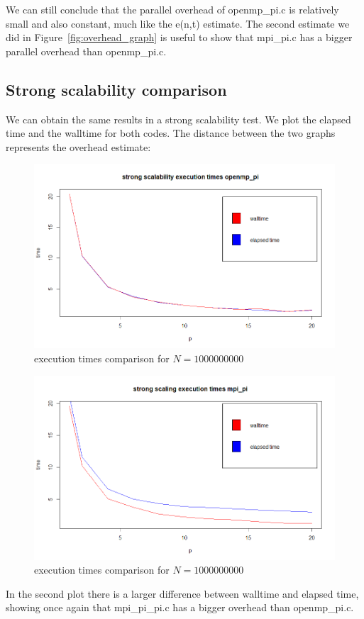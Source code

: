 \documentclass{article}
\begin{document}
We can still conclude that the parallel overhead of openmp\_pi.c is relatively small and also constant, much like the e(n,t) estimate. The second estimate we did in Figure~\ref{fig:overhead_graph} is useful to show that mpi\_pi.c has a bigger parallel overhead than openmp\_pi.c.

\subsection{Strong scalability comparison}
We can obtain the same results in a strong scalability test.
We plot the elapsed time and the walltime for both codes. The distance between the two graphs represents the overhead estimate:
\begin{figure}[H] %
	\centering
	\includegraphics[width=0.9\columnwidth]{graphs/strong_scaling_times_comparison_openmp.png} %
	\caption{execution times comparison for $N=1000000000$}
\end{figure}
\begin{figure}[H] %
	\centering
	\includegraphics[width=0.9\columnwidth]{graphs/strong_scaling_times_comparison_mpi.png} %
	\caption{execution times comparison for $N=1000000000$}
\end{figure}
In the second plot there is a larger difference between walltime and elapsed time, showing once again that mpi\_pi\_pi.c has a bigger overhead than openmp\_pi.c.
\end{document}
